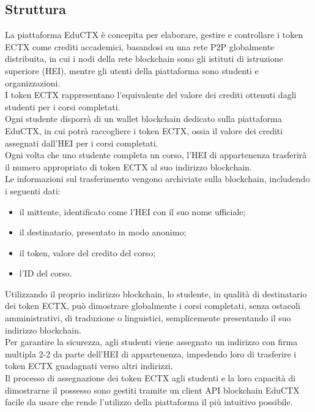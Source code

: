\subsection{Struttura}
La piattaforma EduCTX è concepita per elaborare, gestire e controllare i token ECTX come crediti accademici, basandosi su una rete P2P globalmente distribuita, 
in cui i nodi della rete blockchain sono gli istituti di istruzione superiore (HEI), mentre gli utenti della piattaforma sono studenti e organizzazioni.
\\I token ECTX rappresentano l’equivalente del valore dei crediti ottenuti dagli studenti per i corsi completati.
\\Ogni studente disporrà di un wallet blockchain dedicato sulla piattaforma EduCTX, in cui potrà raccogliere i token ECTX, ossia il valore dei crediti assegnati dall’HEI per i corsi completati. 
\\Ogni volta che uno studente completa un corso, l’HEI di appartenenza trasferirà il numero appropriato di token ECTX al suo indirizzo blockchain. 
\\Le informazioni sul trasferimento vengono archiviate sulla blockchain, 
includendo i seguenti dati: 
\begin{itemize}
    \item il mittente, identificato come l’HEI con il suo nome ufficiale;
    \item il destinatario, presentato in modo anonimo;
    \item il token, valore del credito del corso;
    \item l’ID del corso.
\end{itemize}
Utilizzando il proprio indirizzo blockchain, lo studente, in qualità di destinatario dei token ECTX, può dimostrare globalmente i corsi completati, senza ostacoli amministrativi, di traduzione o linguistici, semplicemente presentando il suo indirizzo blockchain. 
\\Per garantire la sicurezza, agli studenti viene assegnato un indirizzo con firma multipla 2-2 da parte dell’HEI di appartenenza, impedendo loro di trasferire i token ECTX guadagnati verso altri indirizzi. 
\\Il processo di assegnazione dei token ECTX agli studenti e la loro capacità di dimostrarne il possesso sono gestiti tramite un client API blockchain EduCTX facile da usare che rende l’utilizzo della piattaforma il più intuitivo possibile.
